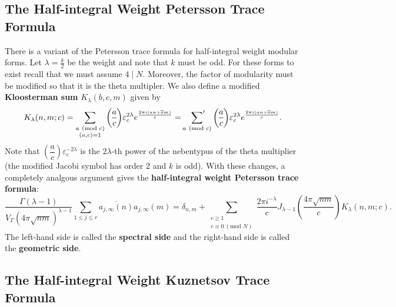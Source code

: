 \documentclass[12pt]{book}
\theoremstyle{definition}\newframedtheorem{method}{Method}
\newcommand{\psum}{\sideset{}{'}\sum}
\newcommand{\legendre}[2]{\genfrac{(}{)}{0.5pt}{0}{#1}{#2}}
\newcommand{\tmod}[1]{\ \left(\text{mod }#1\right)}
\renewcommand{\d}{\delta}
\renewcommand{\l}{\lambda}
\newcommand{\G}{\Gamma}
\newcommand{\e}{\varepsilon}
\newcommand{\<}{\langle}
\renewcommand{\>}{\rangle}
\newcommand{\conj}{\overline}
\begin{document}
    \subsection*{The Half-integral Weight Petersson Trace Formula}
      There is a variant of the Petersson trace formula for half-integral weight modular forms. Let $\l = \frac{k}{2}$ be the weight and note that $k$ must be odd. For these forms to exist recall that we must assume $4 \mid N$. Moreover, the factor of modularity must be modified so that it is the theta multipler. We also define a modified \textbf{Kloosterman sum} $K_{\l}(b,c,m)$ given by
      \[
        K_{\l}(n,m;c) = \sum_{\substack{a \tmod{c} \\ (a,c) = 1}}\legendre{a}{c}\e_{c}^{2\l}e^{\frac{2\pi i(an+\conj{a}m)}{c}} = \psum_{a \tmod{c}}\legendre{a}{c}\e_{c}^{2\l}e^{\frac{2\pi i(an+\conj{a}m)}{c}}.
      \]
      Note that $\legendre{a}{c}\e_{c}^{-2\l}$ is the $2\l$-th power of the nebentypus of the theta multiplier (the modified Jacobi symbol has order $2$ and $k$ is odd). With these changes, a completely analgous argument gives the \textbf{half-integral weight Petersson trace formula}:
      \[
        \frac{\G\left(\l-1\right)}{V_{\G}(4\pi\sqrt{nm})^{\l-1}}\sum_{1 \le j \le r}\conj{a_{j,\infty}(n)}a_{j,\infty}(m) = \d_{n,m}+\sum_{\substack{c \ge 1 \\ c \equiv 0 \tmod{N}}}\frac{2\pi i^{-\l}}{c}J_{\l-1}\left(\frac{4\pi\sqrt{nm}}{c}\right)K_{\l}(n,m;c).
      \]
      The left-hand side is called the \textbf{spectral side} and the right-hand side is called the \textbf{geometric side}.
    \subsection*{The Half-integral Weight Kuznetsov Trace Formula}

\begin{appendix}

\end{appendix}

\printindex


\end{document}
